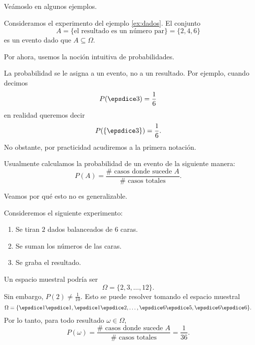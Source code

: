 Veámoslo en algunos ejemplos.

\begin{example}
    Consideramos el experimento del ejemplo \ref{ex:dados}. El conjunto
    \begin{equation*}
        A = \{ \text{el resultado es un número par} \} = \{2, 4, 6\}
    \end{equation*}
    es un evento dado que $A \subseteq \Omega$.
\end{example}

Por ahora, usemos la noción intuitiva de probabilidades. 

La probabilidad se le asigna a un evento, no a un resultado. Por ejemplo, cuando decimos
\begin{equation*}
    P(\vcdice{3}) = \frac{1}{6}
\end{equation*}
en realidad queremos decir
\begin{equation*}
    P(\{ \vcdice{3} \}) = \frac{1}{6}.
\end{equation*}
No obstante, por practicidad acudiremos a la primera notación.

Usualmente calculamos la probabilidad de un evento de la siguiente manera:
\begin{equation*}
    P(A) = \frac{\# \text{ casos donde sucede } A}{\# \text{ casos totales}}.
\end{equation*}

Veamos por qué esto no es generalizable.

\begin{example}
    Consideremos el siguiente experimento:
    \begin{centeredvarwidth}
        \begin{enumerate}
            \item Se tiran $2$ dados balanceados de $6$ caras.
            \item Se suman los números de las caras.
            \item Se graba el resultado.
        \end{enumerate}
    \end{centeredvarwidth}

    Un espacio muestral podría ser
    \begin{equation*}
        \Omega = \{ 2, 3, \ldots, 12 \}.
    \end{equation*}
    Sin embargo, $P(2) \neq \frac{1}{10}$. Esto se puede resolver tomando el espacio muestral
    \begin{equation*}
        \Omega = \{ \vcdice{1} \vcdice{1}, \vcdice{1} \vcdice{2}, \ldots, \vcdice{6} \vcdice{5}, \vcdice{6} \vcdice{6} \}.
    \end{equation*}
    Por lo tanto, para todo resultado $\omega \in \Omega$, 
    \begin{equation*}
        P(\omega) = \frac{\# \text{ casos donde sucede } A}{\# \text{ casos totales}} = \frac{1}{36}.
    \end{equation*}
\end{example}

